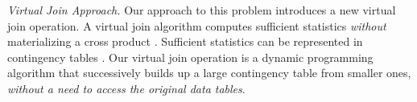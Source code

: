 \documentclass{acm_proc_article-sp}
\begin{document}
\emph{Virtual Join Approach.} Our approach to this problem introduces a new virtual join operation. A virtual join algorithm computes sufficient statistics {\em without} materializing a cross product \cite{Yin2004}. Sufficient statistics can be represented in contingency tables \cite{Moore1998}. Our virtual join operation is a dynamic programming algorithm that successively builds up a large contingency table from smaller ones, {\em without a need to access the original data tables}.
%
%
\end{document}
